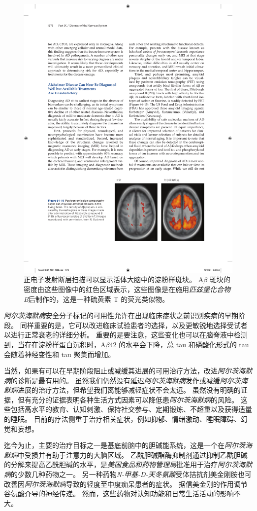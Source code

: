 \begin{figure}[htbp]
	\centering
	\includegraphics[width=0.6\linewidth]{chap64/fig_64_15}
	\caption{正电子发射断层扫描可以显示活体大脑中的淀粉样斑块。
		A$\beta$ 斑块的密度由这些图像中的红色区域表示，这些图像是在施用\textit{匹兹堡化合物B}后制作的，这是一种硫黄素 T 的荧光类似物。}
	\label{fig:64_15}
\end{figure}


\textit{阿尔茨海默病}安全分子标记的可用性允许在出现临床症状之前识别疾病的早期阶段。
同样重要的是，它可以改进临床试验患者的选择，以及更敏锐地选择受试者以进行正常衰老的详细分析。
重要的是要注意，这些变化也可以在脑脊液中检测到，当存在淀粉样蛋白沉积时，A$\beta$42 的水平会下降，总 tau 和磷酸化形式的 tau 会随着神经变性和 tau 聚集而增加。


当然，如果有可以在早期阶段阻止或减缓其进展的可用治疗方法，改进\textit{阿尔茨海默病}的诊断是最有用的。
虽然我们仍然没有延迟\textit{阿尔茨海默病}发作或减缓\textit{阿尔茨海默病}进展的治疗方法，但希望我们离能够减轻症状不会太远。
虽然没有明确的证据，但有充分的证据表明各种生活方式因素可以降低患\textit{阿尔茨海默病}的风险。
这些包括高水平的教育、认知刺激、保持社交参与、定期锻炼、不超重以及获得适量的睡眠。
目前的疗法侧重于治疗相关症状，例如抑郁、情绪激动、睡眠障碍、幻觉和妄想。


迄今为止，主要的治疗目标之一是基底前脑中的胆碱能系统，这是一个在\textit{阿尔茨海默病}中受损并有助于注意力的大脑区域。
乙酰胆碱酯酶抑制剂通过抑制乙酰胆碱的分解来提高乙酰胆碱的水平，是\textit{美国食品和药物管理局}批准用于治疗\textit{阿尔茨海默病}的少数几种药物之一。
另一种药物\textit{N-甲基-D-天冬氨酸}受体拮抗剂美金刚胺也可改善因\textit{阿尔茨海默病}导致的轻度至中度痴呆患者的症状。
据信美金刚的作用调节谷氨酸介导的神经传递。
然而，这些药物对认知功能和日常生活活动的影响不大。


